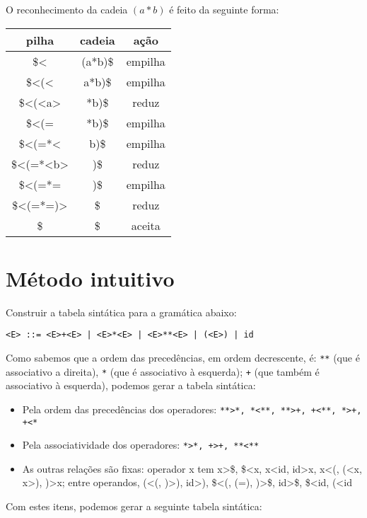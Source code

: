 \documentclass{article}
\begin{document}
O reconhecimento da cadeia $(a*b)$ é feito da seguinte forma:
\begin{center}
\begin{tabular}{ |c|c|c| } 
\hline
pilha & cadeia & ação\\
\hline
\$< & (a*b)\$ & empilha\\
\hline
\$<(< & a*b)\$ & empilha\\
\hline
\$<(<a> & *b)\$ & reduz\\
\hline
\$<(= & *b)\$ & empilha\\
\hline
\$<(=*< & b)\$ & empilha\\
\hline
\$<(=*<b> & )\$ & reduz\\
\hline
\$<(=*= & )\$ & empilha\\
\hline
\$<(=*=)> & \$ & reduz\\
\hline
\$ & \$ & aceita\\
\hline
\end{tabular}
\end{center}

\section{Método intuitivo}

Construir a tabela sintática para a gramática abaixo:

\begin{lstlisting}
<E> ::= <E>+<E> | <E>*<E> | <E>**<E> | (<E>) | id
\end{lstlisting}

Como sabemos que a ordem das precedências, em ordem decrescente, é: \texttt{**} (que é associativo a direita), \texttt{*} (que é associativo à esquerda); \texttt{+} (que também é associativo à esquerda), podemos gerar a tabela sintática:

\begin{itemize}
    \item Pela ordem das precedências dos operadores: \texttt{**>*, *<**, **>+, +<**, *>+, +<*}
    \item Pela associatividade dos operadores: \texttt{*>*, +>+, **<**}
    \item As outras relações são fixas: operador x tem x>\$, \$<x, x<id, id>x, x<(, (<x, x>), )>x; entre operandos, (<(, )>), id>), \$<(, (=), )>\$, id>\$, \$<id, (<id
\end{itemize}

Com estes itens, podemos gerar a seguinte tabela sintática:
\end{document}
